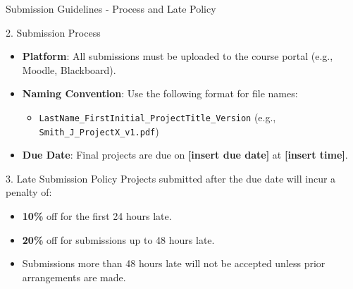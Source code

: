 \documentclass[aspectratio=169]{beamer}
\begin{document}
\begin{frame}[fragile]{Submission Guidelines - Process and Late Policy}
  \begin{block}{2. Submission Process}
    \begin{itemize}
      \item \textbf{Platform}: All submissions must be uploaded to the course portal (e.g., Moodle, Blackboard).
      \item \textbf{Naming Convention}: Use the following format for file names:
        \begin{itemize}
          \item \texttt{LastName\_FirstInitial\_ProjectTitle\_Version} (e.g., \texttt{Smith\_J\_ProjectX\_v1.pdf})
        \end{itemize}
      \item \textbf{Due Date}: Final projects are due on \textbf{[insert due date]} at \textbf{[insert time]}.
    \end{itemize}
  \end{block}

  \begin{block}{3. Late Submission Policy}
    Projects submitted after the due date will incur a penalty of:
    \begin{itemize}
      \item \textbf{10\%} off for the first 24 hours late.
      \item \textbf{20\%} off for submissions up to 48 hours late.
      \item Submissions more than 48 hours late will not be accepted unless prior arrangements are made.
    \end{itemize}
  \end{block}
\end{frame}
\end{document}
